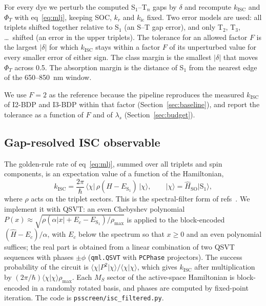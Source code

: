 \documentclass[journal=jctcce,manuscript=article,layout=twocolumn]{achemso}
\newcommand{\kisc}{k_\mathrm{ISC}}
\newcommand{\Hso}{\hat H_\mathrm{SO}}
\begin{document}
For every dye we perturb the computed S$_1$--T$_n$ gaps by $\delta$ and recompute $\kisc$ and $\Phi_T$
with eq~\ref{eq:mlj}, keeping SOC, $k_r$ and $k_\mathrm{ic}$ fixed. Two error models are used: all
triplets shifted together relative to S$_1$ (an S--T gap error), and only T$_2$, T$_3$, \dots\ shifted
(an error in the upper triplets). The tolerance for an allowed factor $F$ is the largest $\lvert\delta\rvert$
for which $\kisc$ stays within a factor $F$ of its unperturbed value for every smaller error of either
sign. The class margin is the smallest $\lvert\delta\rvert$ that moves $\Phi_T$ across 0.5. The
absorption margin is the distance of S$_1$ from the nearest edge of the 650--850~nm window.

We use $F=2$ as the reference because the pipeline reproduces the measured $\kisc$ of I2-BDP and
I3-BDP within that factor (Section~\ref{sec:baseline}), and report the tolerance as a function of $F$ and
of $\lambda_s$ (Section~\ref{sec:budget}).

\subsection{Gap-resolved ISC observable}
\label{sec:filter-method}

The golden-rule rate of eq~\ref{eq:mlj}, summed over all triplets and spin components, is an
expectation value of a function of the Hamiltonian,
\begin{equation}
  \kisc = \frac{2\pi}{\hbar}\,\langle\chi\rvert\,\rho(\hat H - E_{\mathrm{S}_1})\,\lvert\chi\rangle,\qquad
  \lvert\chi\rangle = \Hso\lvert\mathrm{S}_1\rangle ,
  \label{eq:filter}
\end{equation}
where $\rho$ acts on the triplet sectors. This is the spectral-filter form of
refs~. We implement it with QSVT: an even Chebyshev polynomial
$P(x)\approx\sqrt{\rho(\alpha\lvert x\rvert + E_c - E_{\mathrm{S}_1})/\rho_\mathrm{max}}$ is applied to the
block-encoded $(\hat H-E_c)/\alpha$, with $E_c$ below the spectrum so that $x\ge0$ and an even polynomial
suffices; the real part is obtained from a linear combination of two QSVT sequences with phases
$\pm\phi$ (\texttt{qml.QSVT} with \texttt{PCPhase} projectors). The success probability of the circuit
is $\langle\chi\rvert P^2\lvert\chi\rangle/\langle\chi\vert\chi\rangle$, which gives $\kisc$ after
multiplication by $(2\pi/\hbar)\langle\chi\vert\chi\rangle\rho_\mathrm{max}$. Each $M_S$ sector of the
active-space Hamiltonian is block-encoded in a randomly rotated basis, and phases are computed by
fixed-point iteration. The code is \texttt{psscreen/isc\_filtered.py}.
\end{document}
